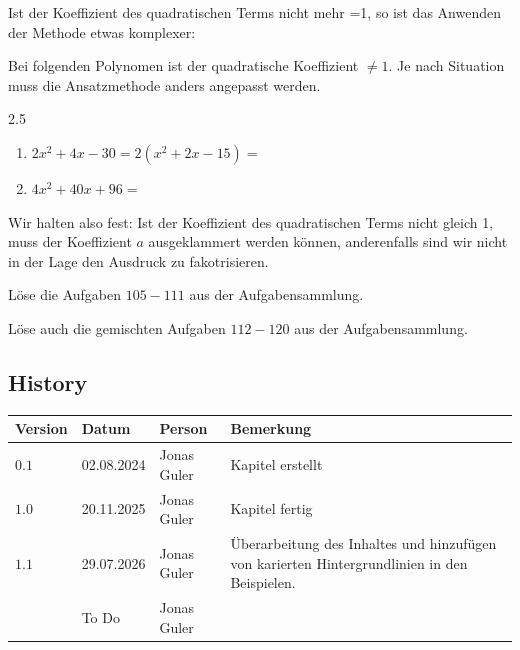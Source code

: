\documentclass[11pt,oneside]{article}
\begin{document}
    Ist der Koeffizient des quadratischen Terms nicht mehr =1, so ist das Anwenden der Methode etwas komplexer:
    \begin{beispiel}
        Bei folgenden Polynomen ist der quadratische Koeffizient $ \neq 1 $. Je nach Situation muss die Ansatzmethode anders angepasst werden.
        \begin{gridspace}{2.5}
        	\begin{enumerate}[label=\alph*)]
        		\item $2x^{2} + 4x - 30 = 2(x^{2}+2x-15) =$
        		\item $4x^{2} + 40x + 96 = $
        	\end{enumerate}
        \end{gridspace}
    \end{beispiel}
    Wir halten also fest: Ist der Koeffizient des quadratischen Terms nicht gleich 1, muss der Koeffizient $a$ ausgeklammert werden können, anderenfalls sind wir nicht in der Lage den Ausdruck zu fakotrisieren.
    \begin{aufgabe}
        Löse die Aufgaben $105-111$ aus der Aufgabensammlung.
    \end{aufgabe}
    \begin{aufgabe}
        Löse auch die gemischten Aufgaben $112-120$ aus der Aufgabensammlung.
    \end{aufgabe}


\newpage
\subsection*{History}
\begin{table}[H]
    \centering
    \begin{tabular}{|p{13mm}|p{20mm}|p{30mm}|p{70mm}|}\hline
        Version & Datum & Person & Bemerkung \\\hline
        $0.1$ & 02.08.2024 & Jonas Guler & Kapitel erstellt \\\hline
        $1.0$ & 20.11.2025 & Jonas Guler & Kapitel fertig \\\hline
        $1.1$ & 29.07.2026 & Jonas Guler & Überarbeitung des Inhaltes und hinzufügen von karierten Hintergrundlinien in den Beispielen. \\\hline
         & To Do & Jonas Guler &  \\\hline
    \end{tabular}
\end{table}
\end{document}
